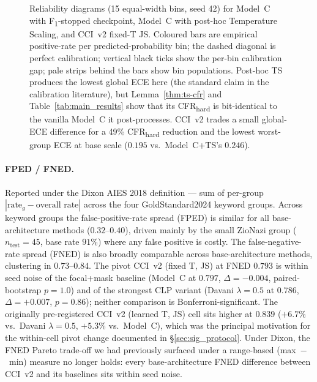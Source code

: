 \begin{figure}[h]
\centering
\caption{Reliability diagrams (15 equal-width bins, seed 42) for Model~C with F\textsubscript{1}-stopped checkpoint, Model~C with post-hoc Temperature Scaling, and CCI~v2 fixed-T JS. Coloured bars are empirical positive-rate per predicted-probability bin; the dashed diagonal is perfect calibration; vertical black ticks show the per-bin calibration gap; pale strips behind the bars show bin populations. Post-hoc TS produces the lowest global ECE here (the standard claim in the calibration literature), but Lemma~\ref{thm:ts-cfr} and Table~\ref{tab:main_results} show that its CFR\textsubscript{hard} is bit-identical to the vanilla Model~C it post-processes. CCI~v2 trades a small global-ECE difference for a 49\% CFR\textsubscript{hard} reduction and the lowest worst-group ECE at base scale ($0.195$ vs.\ Model~C+TS's $0.246$).}
\label{fig:reliability}
\end{figure}

\paragraph{FPED / FNED.}
Reported under the Dixon AIES 2018 definition --- sum of per-group $|\text{rate}_g - \text{overall rate}|$ across the four GoldStandard2024 keyword groups. Across keyword groups the false-positive-rate spread (FPED) is similar for all base-architecture methods ($0.32$--$0.40$), driven mainly by the small ZioNazi group ($n_{\text{test}} = 45$, base rate $91\%$) where any false positive is costly. The false-negative-rate spread (FNED) is also broadly comparable across base-architecture methods, clustering in $0.73$--$0.84$. The pivot CCI~v2 (fixed T, JS) at FNED $0.793$ is within seed noise of the focal+mask baseline (Model~C at $0.797$, $\Delta = -0.004$, paired-bootstrap $p = 1.0$) and of the strongest CLP variant (Davani $\lambda=0.5$ at $0.786$, $\Delta = +0.007$, $p = 0.86$); neither comparison is Bonferroni-significant. The originally pre-registered CCI~v2 (learned T, JS) cell sits higher at $0.839$ ($+6.7\%$ vs.\ Davani $\lambda=0.5$, $+5.3\%$ vs.\ Model~C), which was the principal motivation for the within-cell pivot change documented in \S\ref{sec:sig_protocol}. Under Dixon, the FNED Pareto trade-off we had previously surfaced under a range-based (max~$-$~min) measure no longer holds: every base-architecture FNED difference between CCI~v2 and its baselines sits within seed noise.


